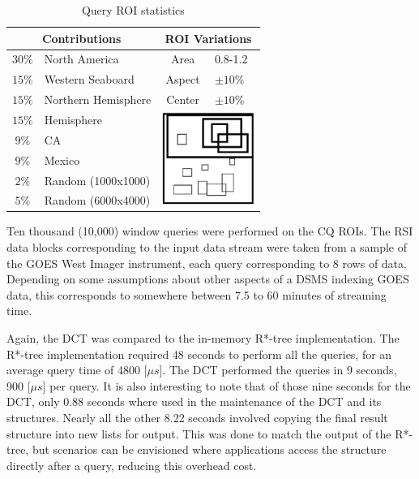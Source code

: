 \documentclass{ucdthesis}       %
\begin{document}
\begin{table}[htb]
  \centering
  \caption{Query \ac{ROI} statistics}
  \begin{tabular}[t]{cl||cl}
    \multicolumn{2}{c|}{Contributions} & \multicolumn{2}{|c}{\ac{ROI} Variations} \\
    \hline \hline
    $30\%$ & North America & Area & 0.8-1.2 \\
    $15\%$ & Western Seaboard & Aspect & $\pm 10\%$ \\
    $15\%$ & Northern Hemisphere & Center & $\pm 10\%$ \\
    $15\%$ & Hemisphere & \multicolumn{2}{|c}{\multirow{5}{4cm}{\centering \includegraphics[width=3cm]{figs/performance-goes.fig.eps}}}         \\     
    $9\%$  & CA  &           \\    
    $9\%$ & Mexico &             \\    
    $2\%$ & Random (1000x1000) &  \\    
    $5\%$ & Random (6000x4000) &       \\
  \end{tabular}
  \label{tab:goes-ex}
\end{table}

Ten thousand (10,000) window queries were performed on the \ac{CQ}
\acp{ROI}.  The \ac{RSI} data blocks corresponding to the input data
stream were taken from a sample of the \ac{GOES} West Imager
instrument, each query corresponding to 8 rows of data.  Depending on
some assumptions about other aspects of a \ac{DSMS} indexing \ac{GOES}
data, this corresponds to somewhere between 7.5 to 60 minutes of
streaming time.

Again, the \ac{DCT} was compared to the in-memory R*-tree implementation.
The R*-tree implementation required 48 seconds to perform all the
queries, for an average query time of 4800 [$\mu s$].  The \ac{DCT}
performed the queries in 9 seconds, 900 [$\mu s$] per query.  It is
also interesting to note that of those nine seconds for the \ac{DCT}, only
0.88 seconds where used in the maintenance of the \ac{DCT} and its
structures.  Nearly all the other 8.22 seconds involved copying the
final result  structure into new lists for output.  This was done to
match the output of the R*-tree, but scenarios can be envisioned where
applications access the  structure directly after a query, reducing
this overhead cost.
\end{document}
